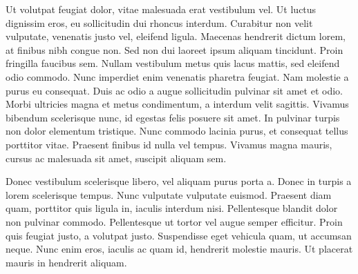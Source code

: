 Ut volutpat feugiat dolor, vitae malesuada erat vestibulum vel. Ut luctus dignissim eros, eu sollicitudin dui rhoncus interdum. Curabitur non velit vulputate, venenatis justo vel, eleifend ligula. Maecenas hendrerit dictum lorem, at finibus nibh congue non. Sed non dui laoreet ipsum aliquam tincidunt. Proin fringilla faucibus sem. Nullam vestibulum metus quis lacus mattis, sed eleifend odio commodo. Nunc imperdiet enim venenatis pharetra feugiat. Nam molestie a purus eu consequat. Duis ac odio a augue sollicitudin pulvinar sit amet et odio. Morbi ultricies magna et metus condimentum, a interdum velit sagittis. Vivamus bibendum scelerisque nunc, id egestas felis posuere sit amet. In pulvinar turpis non dolor elementum tristique. Nunc commodo lacinia purus, et consequat tellus porttitor vitae. Praesent finibus id nulla vel tempus. Vivamus magna mauris, cursus ac malesuada sit amet, suscipit aliquam sem.

Donec vestibulum scelerisque libero, vel aliquam purus porta a. Donec in turpis a lorem scelerisque tempus. Nunc vulputate vulputate euismod. Praesent diam quam, porttitor quis ligula in, iaculis interdum nisi. Pellentesque blandit dolor non pulvinar commodo. Pellentesque ut tortor vel augue semper efficitur. Proin quis feugiat justo, a volutpat justo. Suspendisse eget vehicula quam, ut accumsan neque. Nunc enim eros, iaculis ac quam id, hendrerit molestie mauris. Ut placerat mauris in hendrerit aliquam.

